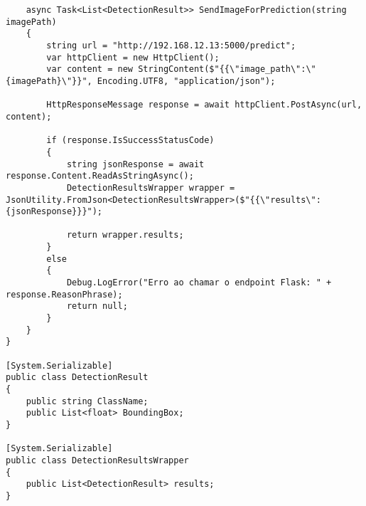 \begin{lstlisting}
    async Task<List<DetectionResult>> SendImageForPrediction(string imagePath)
    {
        string url = "http://192.168.12.13:5000/predict";
        var httpClient = new HttpClient();
        var content = new StringContent($"{{\"image_path\":\"{imagePath}\"}}", Encoding.UTF8, "application/json");

        HttpResponseMessage response = await httpClient.PostAsync(url, content);

        if (response.IsSuccessStatusCode)
        {
            string jsonResponse = await response.Content.ReadAsStringAsync();
            DetectionResultsWrapper wrapper = JsonUtility.FromJson<DetectionResultsWrapper>($"{{\"results\":{jsonResponse}}}");

            return wrapper.results;
        }
        else
        {
            Debug.LogError("Erro ao chamar o endpoint Flask: " + response.ReasonPhrase);
            return null;
        }
    }
}

[System.Serializable]
public class DetectionResult
{
    public string ClassName;
    public List<float> BoundingBox;
}

[System.Serializable]
public class DetectionResultsWrapper
{
    public List<DetectionResult> results;
}
\end{lstlisting}